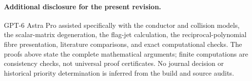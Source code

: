 \paragraph{Additional disclosure for the present revision.}
GPT-6 Astra Pro assisted specifically with the conductor and collision
models, the scalar-matrix degeneration, the flag-jet calculation,
the reciprocal-polynomial fibre presentation, literature comparisons,
and exact computational checks.  The proofs above state the complete
mathematical arguments; finite computations are consistency checks,
not universal proof certificates.  No journal decision or historical
priority determination is inferred from the build and source audits.
